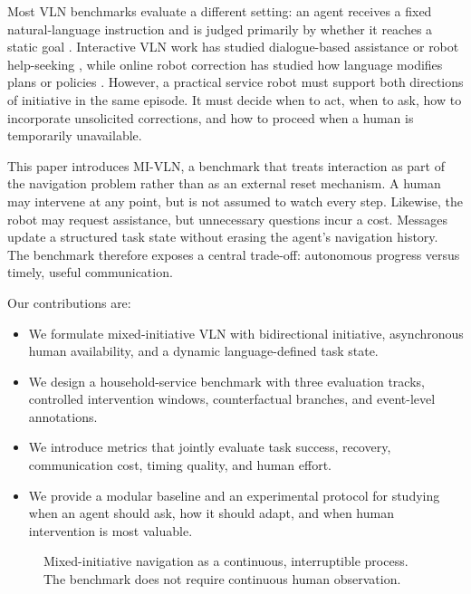 \documentclass[10pt]{article}
\newcommand{\method}{MI-VLN}
\begin{document}
Most VLN benchmarks evaluate a different setting: an agent receives a fixed
natural-language instruction and is judged primarily by whether it reaches a
static goal \cite{anderson2018r2r,ku2020rxr,krantz2020beyond}. Interactive VLN
work has studied dialogue-based assistance or robot help-seeking
\cite{thomason2020cvdn,nguyen2019hanna,zhu2020cmn}, while online robot
correction has studied how language modifies plans or policies
\cite{sharma2022correcting,broad2017language}. However, a practical service
robot must support both directions of initiative in the same episode. It must
decide when to act, when to ask, how to incorporate unsolicited corrections,
and how to proceed when a human is temporarily unavailable.

This paper introduces \method, a benchmark that treats interaction as part of
the navigation problem rather than as an external reset mechanism. A human
may intervene at any point, but is not assumed to watch every step. Likewise,
the robot may request assistance, but unnecessary questions incur a cost.
Messages update a structured task state without erasing the agent's navigation
history. The benchmark therefore exposes a central trade-off: autonomous
progress versus timely, useful communication.

Our contributions are:
\begin{itemize}[leftmargin=1.4em]
  \item We formulate mixed-initiative VLN with bidirectional initiative,
  asynchronous human availability, and a dynamic language-defined task state.
  \item We design a household-service benchmark with three evaluation tracks,
  controlled intervention windows, counterfactual branches, and event-level
  annotations.
  \item We introduce metrics that jointly evaluate task success, recovery,
  communication cost, timing quality, and human effort.
  \item We provide a modular baseline and an experimental protocol for
  studying when an agent should ask, how it should adapt, and when human
  intervention is most valuable.
\end{itemize}

\begin{figure}[t]
\centering
{}
\caption{Mixed-initiative navigation as a continuous, interruptible process.
The benchmark does not require continuous human observation.}
\label{fig:overview}
\end{figure}
\end{document}
